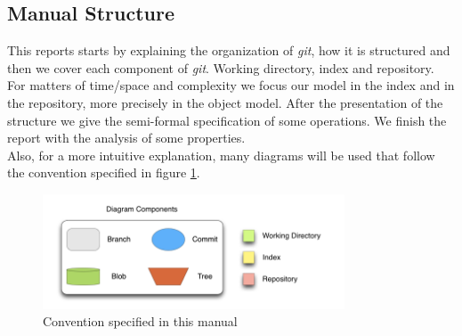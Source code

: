 \subsection{Manual Structure}
This reports starts by explaining the organization of \emph{git}, how
it is structured and then we cover each component of \emph{git}. 
Working directory, index and repository. For matters
of time/space and complexity we focus our model in the index and in the
repository, more precisely in the object model. 
After the presentation of the structure we give the semi-formal
specification of some operations. We finish the report with the
analysis of some properties. \\
Also, for a more intuitive explanation, many diagrams will be used that follow
the convention specified in figure \ref{fig:notation}. 
\begin{figure}[tp]
   \centering
   \includegraphics[width=0.8\textwidth]{images/Legenda.png}
   \caption{Convention specified in this manual}
   \label{fig:notation}
\end{figure}

